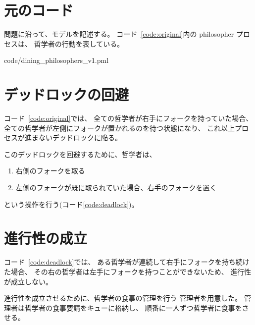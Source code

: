 \section{元のコード}

問題に沿って、モデルを記述する。
コード~\ref{code:original}内の philosopher プロセスは、
哲学者の行動を表している。


	{code/dining_philosophers_v1.pml}

\newpage

\section{デッドロックの回避}

コード~\ref{code:original}では、
全ての哲学者が右手にフォークを持っていた場合、
全ての哲学者が左側にフォークが置かれるのを待つ状態になり、
これ以上プロセスが進まないデッドロックに陥る。

このデッドロックを回避するために、哲学者は、
\begin{enumerate}
	\item 右側のフォークを取る
	\item 左側のフォークが既に取られていた場合、右手のフォークを置く
\end{enumerate}
という操作を行う(コード\ref{code:deadlock})。



\newpage

\section{進行性の成立}

コード~\ref{code:deadlock}では、
ある哲学者が連続して右手にフォークを持ち続けた場合、
その右の哲学者は左手にフォークを持つことができないため、
進行性が成立しない。

進行性を成立させるために、哲学者の食事の管理を行う 
管理者を用意した。
管理者は哲学者の食事要請をキューに格納し、
順番に一人ずつ哲学者に食事をさせる。

